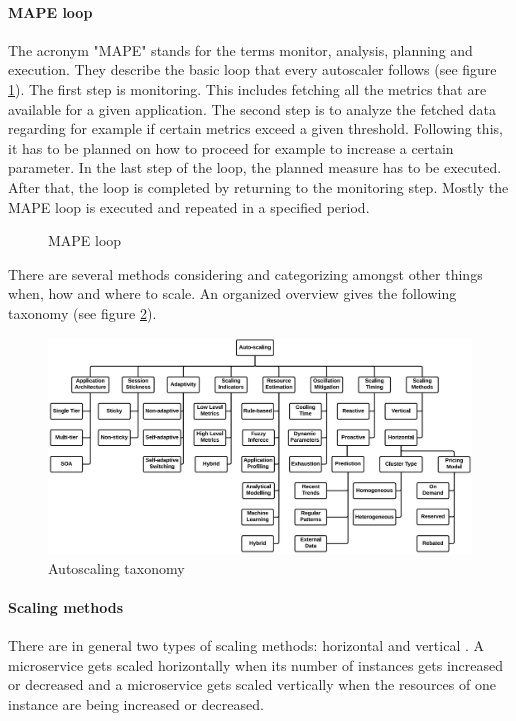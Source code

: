 \documentclass[
	english,
	ruledheaders=section,%
	class=report,%
	thesis={type=master},%
	accentcolor=8c,%
	custommargins=true,%
	marginpar=false,%
	parskip=half-,%
	fontsize=11pt,%
]{tudapub}
\begin{document}
\paragraph{MAPE loop}
The acronym "MAPE" stands for the terms monitor, analysis, planning and execution. They describe the basic loop that every autoscaler follows (see figure \ref{fig:mape}). The first step is monitoring. This includes fetching all the metrics that are available for a given application. The second step is to analyze the fetched data regarding for example if certain metrics exceed a given threshold. Following this, it has to be planned on how to proceed for example to increase a certain parameter. In the last step of the loop, the planned measure has to be executed. After that, the loop is completed by returning to the monitoring step. Mostly the MAPE loop is executed and repeated in a specified period.

\begin{figure}[h]
\centering
{}
\caption{MAPE loop}
\label{fig:mape}
\end{figure}

There are several methods considering and categorizing amongst other things when, how and where to scale. An organized overview gives the following taxonomy (see figure \ref{fig:autoscaling}).

\begin{figure}[h]
    \centering
    \includegraphics[width=\textwidth]{data/basics/autoscaling.png}
    \caption{Autoscaling taxonomy \cite{qu2018auto}}
    \label{fig:autoscaling}
\end{figure}

\paragraph{Scaling methods}
There are in general two types of scaling methods: horizontal and vertical \cite{qu2018auto, midigudla2019performance}.
A microservice gets scaled horizontally when its number of instances gets increased or decreased and a microservice gets scaled vertically when the resources of one instance are being increased or decreased.
\end{document}
